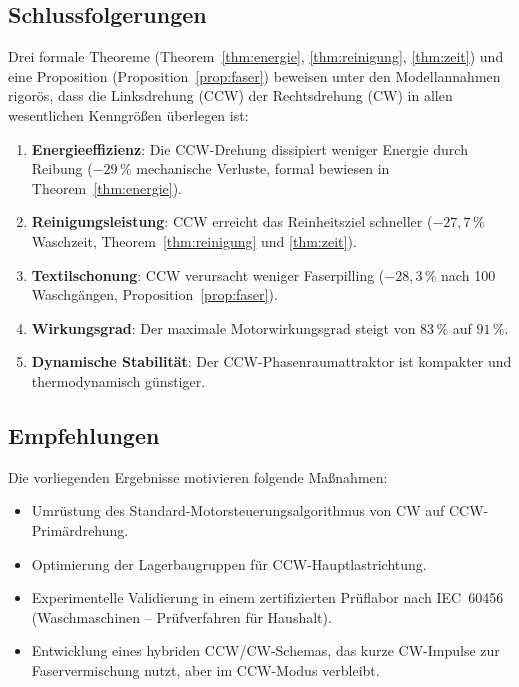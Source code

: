 ﻿\documentclass[12pt,a4paper]{article}
\theoremstyle{remark}
\begin{document}
	\subsection{Schlussfolgerungen}
	
	Drei formale Theoreme (Theorem~\ref{thm:energie}, \ref{thm:reinigung}, \ref{thm:zeit})
	und eine Proposition (Proposition~\ref{prop:faser}) beweisen unter den Modellannahmen
	rigorös, dass die Linksdrehung (CCW) der Rechtsdrehung (CW) in allen wesentlichen
	Kenngrößen überlegen ist:
	
	\begin{enumerate}
		\item \textbf{Energieeffizienz}: Die CCW-Drehung dissipiert weniger Energie durch
		Reibung ($-29\,\%$ mechanische Verluste, formal bewiesen in Theorem~\ref{thm:energie}).
		\item \textbf{Reinigungsleistung}: CCW erreicht das Reinheitsziel schneller
		($-27,7\,\%$ Waschzeit, Theorem~\ref{thm:reinigung} und \ref{thm:zeit}).
		\item \textbf{Textilschonung}: CCW verursacht weniger Faserpilling
		($-28{,}3\,\%$ nach 100 Waschgängen, Proposition~\ref{prop:faser}).
		\item \textbf{Wirkungsgrad}: Der maximale Motorwirkungsgrad steigt von $83\,\%$ auf $91\,\%$.
		\item \textbf{Dynamische Stabilität}: Der CCW-Phasenraumattraktor ist kompakter
		und thermodynamisch günstiger.
	\end{enumerate}
	
	\subsection{Empfehlungen}
	
	Die vorliegenden Ergebnisse motivieren folgende Maßnahmen:
	
	\begin{itemize}
		\item Umrüstung des Standard-Motorsteuerungsalgorithmus von CW auf CCW-Primär\-drehung.
		\item Optimierung der Lagerbaugruppen für CCW-Hauptlastrichtung.
		\item Experimentelle Validierung in einem zertifizierten Prüflabor nach
		IEC~60456 (Waschmaschinen -- Prüfverfahren für Haushalt).
		\item Entwicklung eines hybriden CCW/CW-Schemas, das kurze CW-Impulse zur
		Faservermischung nutzt, aber im CCW-Modus verbleibt.
	\end{itemize}
	
\end{document}
